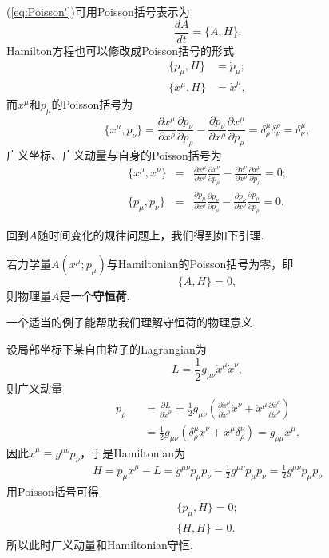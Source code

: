 		(\ref{eq:Poisson'})可用Poisson括号表示为
		\begin{equation}\label{eq:heq1}
		\frac{dA}{dt}=\{A,H\}.
		\end{equation}
		Hamilton方程也可以修改成Poisson括号的形式
		\begin{equation}
		\begin{split}
			\{p_\mu,H\}&={\dot{p}_\mu};\\
			\{x^\mu,H\}&={\dot{x}}^\mu,
		\end{split}
		\end{equation}
		而$x^\mu$和$p_\mu$的Poisson括号为
		\begin{equation}\label{eq:xp}
		\{x^\mu,p_\nu\}=\frac{\partial x^\mu}{\partial x^\rho}\frac{\partial p_\nu}{\partial p_\rho}-\frac{\partial p_\nu}{\partial x^\rho}\frac{\partial x^\mu}{\partial p_\rho}=\delta^\mu_\rho\delta^\rho_\nu=\delta^\mu_\nu,
		\end{equation}
		广义坐标、广义动量与自身的Poisson括号为
		\begin{eqnarray}\label{eq:xxpp}
			\{x^\mu,x^\nu\}&=&\frac{\partial x^\mu}{\partial x^\rho}\frac{\partial x^\nu}{\partial p_\rho}-\frac{\partial x^\nu}{\partial x^\rho}\frac{\partial x^\mu}{\partial p_\rho}=0;\\
			\{p_\mu,p_\nu\}&=&\frac{\partial p_\mu}{\partial x^\rho}\frac{\partial p_\nu}{\partial p_\rho}-\frac{\partial p_\nu}{\partial x^\rho}\frac{\partial p_\mu}{\partial p_\rho}=0.
		\end{eqnarray}

		回到$A$随时间变化的规律问题上，我们得到如下引理.
		\begin{lemma}
		若力学量$A(x^\mu;p_\mu)$与Hamiltonian的Poisson括号为零，即
		\begin{equation}
			\{A,H\}=0,
		\end{equation}
		则物理量$A$是一个\textbf{守恒荷}.
		\end{lemma}
		一个适当的例子能帮助我们理解守恒荷的物理意义.
		\begin{example}
		设局部坐标下某自由粒子的Lagrangian为
		$$L=\frac{1}{2}g_{\mu\nu}\dot{x}^\mu\dot{x}^\nu,$$
		则广义动量
		\begin{eqnarray*}
			p_\rho&&=\frac{\partial L}{\partial {\dot{x}}^\rho}=\frac{1}{2}g_{\mu\nu}\left(\frac{\partial \dot{x}^\mu}{\partial {\dot{x}}^\rho}\dot{x}^\nu+\dot{x}^\mu\frac{\partial \dot{x}^\nu}{\partial {\dot{x}}^\rho}\right)\\
			&&=\frac{1}{2}g_{\mu\nu}\left(\delta^\mu_\rho\dot{x}^\nu+\dot{x}^\mu\delta^\nu_\rho\right)=g_{\rho\mu}\dot{x}^\mu.
		\end{eqnarray*}
		因此$\dot{x}^\mu\equiv g^{\mu\nu}p_\nu$，于是Hamiltonian为
		\begin{eqnarray*}
			H=p_\mu{\dot{x}}^\mu-L=g^{\mu\nu}p_\mu p_\nu-\frac{1}{2}g^{\mu\nu}p_\mu p_\nu=\frac{1}{2}g^{\mu\nu}p_\mu p_\nu	
		\end{eqnarray*}
		用Poisson括号可得
		\begin{eqnarray*}
			\{p_\mu,H\}=0;\\
			\{H,H\}=0.
		\end{eqnarray*}	
		所以此时广义动量和Hamiltonian守恒.
		\end{example}
	
